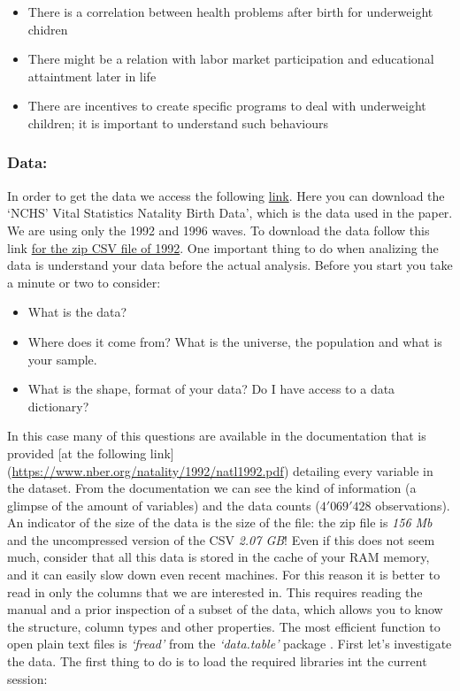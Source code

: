 \documentclass[]{book}
\providecommand{\tightlist}{%
  \setlength{\itemsep}{0pt}\setlength{\parskip}{0pt}}
\begin{document}
\begin{itemize}
\tightlist
\item
  There is a correlation between health problems after birth for
  underweight chidren
\item
  There might be a relation with labor market participation and
  educational attaintment later in life
\item
  There are incentives to create specific programs to deal with
  underweight children; it is important to understand such behaviours
\end{itemize}

\subsubsection{Data:}\label{data}

In order to get the data we access the following
\href{https://www.nber.org/data/vital-statistics-natality-data.html}{link}.
Here you can download the `NCHS' Vital Statistics Natality Birth Data',
which is the data used in the paper. We are using only the 1992 and 1996
waves. To download the data follow this link
\href{https://www.nber.org/natality/1992/natl1992.csv.zip}{for the zip
CSV file of 1992}. One important thing to do when analizing the data is
understand your data before the actual analysis. Before you start you
take a minute or two to consider:

\begin{itemize}
\tightlist
\item
  What is the data?
\item
  Where does it come from? What is the universe, the population and what
  is your sample.
\item
  What is the shape, format of your data? Do I have access to a data
  dictionary?
\end{itemize}

In this case many of this questions are available in the documentation
that is provided {[}at the following link{]}
(\url{https://www.nber.org/natality/1992/natl1992.pdf}) detailing every
variable in the dataset. From the documentation we can see the kind of
information (a glimpse of the amount of variables) and the data counts
(\(4'069'428\) observations). An indicator of the size of the data is
the size of the file: the zip file is \emph{156 Mb} and the uncompressed
version of the CSV \emph{2.07 GB}! Even if this does not seem much,
consider that all this data is stored in the cache of your RAM memory,
and it can easily slow down even recent machines. For this reason it is
better to read in only the columns that we are interested in. This
requires reading the manual and a prior inspection of a subset of the
data, which allows you to know the structure, column types and other
properties. The most efficient function to open plain text files is
\emph{`fread'} from the \emph{`data.table'} package
\citep{R-data.table}. First let's investigate the data. The first thing
to do is to load the required libraries int the current session:
\end{document}
